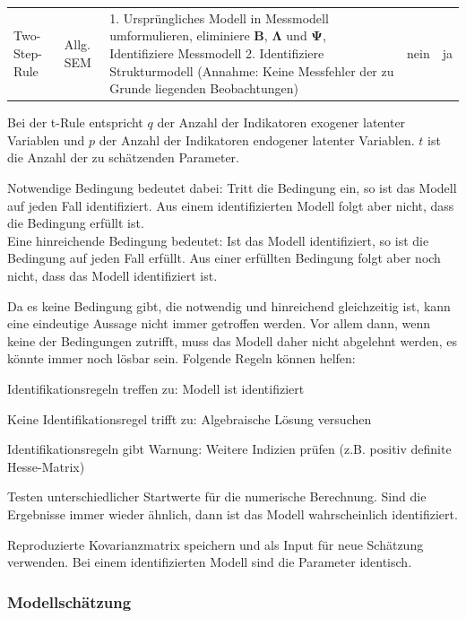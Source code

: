 \documentclass{article}
\numberwithin{equation}{section}
\begin{document}
\begin{tabular}{lllcc}
Two-Step-Rule & Allg. SEM & \pbox{7.5cm}{1. Ursprüngliches Modell in Messmodell umformulieren, eliminiere $\mathbf{B}$, $\boldsymbol \Lambda$ und $\boldsymbol \Psi$, Identifiziere Messmodell\\ 2. Identifiziere Strukturmodell (Annahme: Keine Messfehler der zu Grunde liegenden Beobachtungen)} & nein & ja
\end{tabular}

Bei der t-Rule entspricht $q$ der Anzahl der Indikatoren exogener latenter Variablen und $p$ der Anzahl der Indikatoren endogener latenter Variablen. $t$ ist die Anzahl der zu schätzenden Parameter.

Notwendige Bedingung bedeutet dabei: Tritt die Bedingung ein, so ist das Modell auf jeden Fall identifiziert. Aus einem identifizierten Modell folgt aber nicht, dass die Bedingung erfüllt ist.\\
Eine hinreichende Bedingung bedeutet: Ist das Modell identifiziert, so ist die Bedingung auf jeden Fall erfüllt. Aus einer erfüllten Bedingung folgt aber noch nicht, dass das Modell identifiziert ist.

Da es keine Bedingung gibt, die notwendig und hinreichend gleichzeitig ist, kann eine eindeutige Aussage nicht immer getroffen werden. Vor allem dann, wenn keine der Bedingungen zutrifft, muss das Modell daher nicht abgelehnt werden, es könnte immer noch lösbar sein. Folgende Regeln können helfen:

\begin{compactitem}
\item Identifikationsregeln treffen zu: Modell ist identifiziert
\item Keine Identifikationsregel trifft zu: Algebraische Lösung versuchen
\item Identifikationsregeln gibt Warnung: Weitere Indizien prüfen (z.B. positiv definite Hesse-Matrix)
\item Testen unterschiedlicher Startwerte für die numerische Berechnung. Sind die Ergebnisse immer wieder ähnlich, dann ist das Modell wahrscheinlich identifiziert.
\item Reproduzierte Kovarianzmatrix speichern und als Input für neue Schätzung verwenden. Bei einem identifizierten Modell sind die Parameter identisch.
\end{compactitem}

\subsubsection{Modellschätzung}
\end{document}
